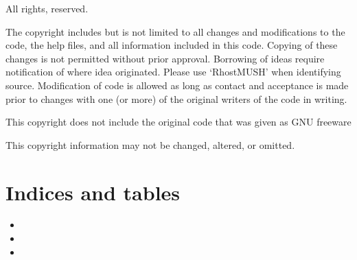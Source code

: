 \documentclass[letterpaper,10pt,english]{sphinxmanual}
\begin{document}
\sphinxAtStartPar
All rights, reserved.

\sphinxAtStartPar
The copyright includes but is not limited to all changes and modifications to
the code, the help files, and all information included in this code.
Copying of these changes is not permitted without prior approval.
Borrowing of ideas require notification of where idea originated.
Please use ‘RhostMUSH’ when identifying source. Modification of code is allowed
as long as contact and acceptance is made prior to changes with one (or more) of
the original writers of the code in writing.

\sphinxAtStartPar
This copyright does not include the original code that was given as GNU freeware

\sphinxAtStartPar
This copyright information may not be changed, altered, or omitted.


\section{Indices and tables}
\label{\detokenize{index:indices-and-tables}}\begin{itemize}
\item {} 
\sphinxAtStartPar
{}

\item {} 
\sphinxAtStartPar
{}

\item {} 
\sphinxAtStartPar
{}

\end{itemize}



\renewcommand{\indexname}{Index}
\printindex
\end{document}
